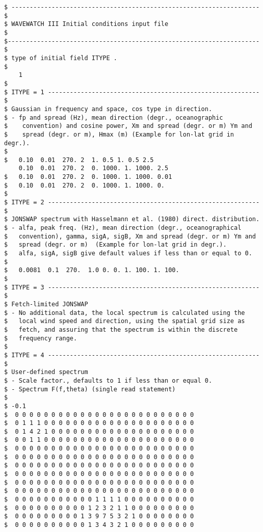 \begin{footnotesize}
\begin{verbatim}
$ -------------------------------------------------------------------- $
$ WAVEWATCH III Initial conditions input file                          $
$--------------------------------------------------------------------- $
$ type of initial field ITYPE .
$
    1
$
$ ITYPE = 1 ---------------------------------------------------------- $
$ Gaussian in frequency and space, cos type in direction.
$ - fp and spread (Hz), mean direction (degr., oceanographic
$    convention) and cosine power, Xm and spread (degr. or m) Ym and
$    spread (degr. or m), Hmax (m) (Example for lon-lat grid in degr.).
$
$   0.10  0.01  270. 2  1. 0.5 1. 0.5 2.5
    0.10  0.01  270. 2  0. 1000. 1. 1000. 2.5
$   0.10  0.01  270. 2  0. 1000. 1. 1000. 0.01
$   0.10  0.01  270. 2  0. 1000. 1. 1000. 0.
$
$ ITYPE = 2 ---------------------------------------------------------- $
$ JONSWAP spectrum with Hasselmann et al. (1980) direct. distribution.
$ - alfa, peak freq. (Hz), mean direction (degr., oceanographical
$   convention), gamma, sigA, sigB, Xm and spread (degr. or m) Ym and
$   spread (degr. or m)  (Example for lon-lat grid in degr.).
$   alfa, sigA, sigB give default values if less than or equal to 0.
$
$   0.0081  0.1  270.  1.0 0. 0. 1. 100. 1. 100.
$
$ ITYPE = 3 ---------------------------------------------------------- $
$ Fetch-limited JONSWAP
$ - No additional data, the local spectrum is calculated using the
$   local wind speed and direction, using the spatial grid size as
$   fetch, and assuring that the spectrum is within the discrete
$   frequency range.
$
$ ITYPE = 4 ---------------------------------------------------------- $
$ User-defined spectrum
$ - Scale factor., defaults to 1 if less than or equal 0.
$ - Spectrum F(f,theta) (single read statement)
$
$ -0.1
$  0 0 0 0 0 0 0 0 0 0 0 0 0 0 0 0 0 0 0 0 0 0 0 0 0
$  0 1 1 1 0 0 0 0 0 0 0 0 0 0 0 0 0 0 0 0 0 0 0 0 0
$  0 1 4 2 1 0 0 0 0 0 0 0 0 0 0 0 0 0 0 0 0 0 0 0 0
$  0 0 1 1 0 0 0 0 0 0 0 0 0 0 0 0 0 0 0 0 0 0 0 0 0
$  0 0 0 0 0 0 0 0 0 0 0 0 0 0 0 0 0 0 0 0 0 0 0 0 0
$  0 0 0 0 0 0 0 0 0 0 0 0 0 0 0 0 0 0 0 0 0 0 0 0 0
$  0 0 0 0 0 0 0 0 0 0 0 0 0 0 0 0 0 0 0 0 0 0 0 0 0
$  0 0 0 0 0 0 0 0 0 0 0 0 0 0 0 0 0 0 0 0 0 0 0 0 0
$  0 0 0 0 0 0 0 0 0 0 0 0 0 0 0 0 0 0 0 0 0 0 0 0 0
$  0 0 0 0 0 0 0 0 0 0 0 0 0 0 0 0 0 0 0 0 0 0 0 0 0
$  0 0 0 0 0 0 0 0 0 0 0 1 1 1 1 0 0 0 0 0 0 0 0 0 0
$  0 0 0 0 0 0 0 0 0 0 1 2 3 2 1 1 0 0 0 0 0 0 0 0 0
$  0 0 0 0 0 0 0 0 0 1 3 9 7 5 3 2 1 0 0 0 0 0 0 0 0
$  0 0 0 0 0 0 0 0 0 0 1 3 4 3 2 1 0 0 0 0 0 0 0 0 0

\end{verbatim}
\end{footnotesize}
